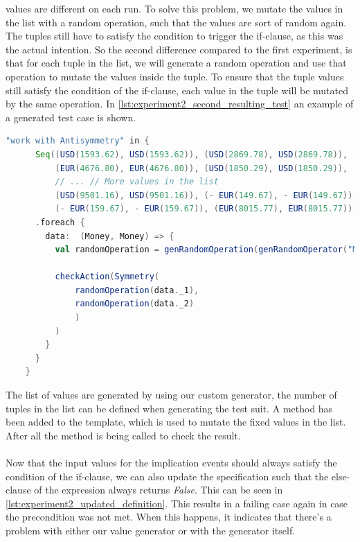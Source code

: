 values are different on each run. To solve this problem, we mutate the values in
the list with a random operation, such that the values are sort of random again. The tuples still have to
satisfy the condition to trigger the if-clause, as this was the actual
intention. So the second difference compared to the first experiment, is that
for each tuple in the list, we will generate a random operation and use that
operation to mutate the values inside the tuple. To ensure that the tuple values
still satisfy the condition of the if-clause, each value in the tuple will be
mutated by the same operation. In
\autoref{lst:experiment2_second_resulting_test} an example of a generated test
case is shown.
\begin{sourcecode}[!ht]
\begin{lstlisting}[language=Scala]
"work with Antisymmetry" in {
      Seq((USD(1593.62), USD(1593.62)), (USD(2869.78), USD(2869.78)),
          (EUR(4676.80), EUR(4676.80)), (USD(1850.29), USD(1850.29)),
          // ... // More values in the list
          (USD(9501.16), USD(9501.16)), (- EUR(149.67), - EUR(149.67)),
          (- EUR(159.67), - EUR(159.67)), (EUR(8015.77), EUR(8015.77)))
      .foreach {
        data:  (Money, Money) => {
          val randomOperation = genRandomOperation(genRandomOperator("Money", true), generateRandomMoney(data._1.currency), generateRandomInteger(true), generateRandomInteger(false), generateRandomPercentage(true), generateRandomPercentage(false), Random.nextInt(10))

          checkAction(Symmetry(
              randomOperation(data._1),
              randomOperation(data._2)
              )
          )
        }
      }
    }
\end{lstlisting}
\caption{Resulting test case with semi-random values. Omitted some input tuples for readability.}
\label{lst:experiment2_second_resulting_test}
\end{sourcecode}
\FloatBarrier\noindent
The list of values are generated by using our custom generator, the number of
tuples in the list can be defined when generating the test suit. A method
 has been added to the template, which is used to
mutate the fixed values in the list. After all the  method
is being called to check the result.\\
\\
Now that the input values for the implication events should always satisfy the
condition of the if-clause, we can also update the specification such that the
else-clause of the expression always returns \textit{False}. This can be seen in
\autoref{lst:experiment2_updated_definition}. This results in a failing case
again in case the precondition was not met. When this happens, it indicates
that there's a problem with either our value generator or with the generator itself.

